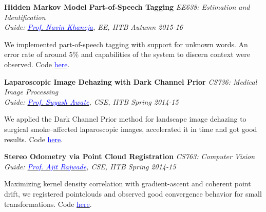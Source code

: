 \documentclass[margin,line]{res}
\newenvironment{list1}{
  \begin{list}{\ding{113}}{%
      \setlength{\itemsep}{0in}
      \setlength{\parsep}{0in} \setlength{\parskip}{0in}
      \setlength{\topsep}{0in} \setlength{\partopsep}{0in} 
      \setlength{\leftmargin}{0.17in}}}{\end{list}}
\begin{document}
\begin{resume}
\vspace*{-0.1in}

{\bf Hidden Markov Model Part-of-Speech Tagging} \hfill \textit{EE638: Estimation and Identification} \\
{\em Guide: \href{https://www.ee.iitb.ac.in/course/~ee638/Navin}{\textcolor{blue}{Prof. Navin Khaneja}}, EE, IITB \hfill Autumn 2015-16} \\
\vspace*{-.15in}
\begin{list1}
\item[] We implemented part-of-speech tagging with support for unknown words. An error rate of around 5\% and capabilities of the system to discern context were observed. Code \href{https://github.com/alankarkotwal/pos-tagging}{\textcolor{blue} {here}}.
\end{list1}

\vspace*{-0.1in}

{\bf Laparoscopic Image Dehazing with Dark Channel Prior} \hfill \textit{CS736: Medical Image Processing} \\
{\em Guide: \href{https://www.cse.iitb.ac.in/~suyash}{\textcolor{blue}{Prof. Suyash Awate}}, CSE, IITB \hfill Spring 2014-15} \\
\vspace*{-.15in}
\begin{list1}
\item[] We applied the Dark Channel Prior method for landscape image dehazing to surgical smoke--affected laparoscopic images, accelerated it in time and got good results. Code \href{https://github.com/riddhishb/Laproscopic-Image-Dehazing}{\textcolor{blue} {here}}.
\end{list1}

\vspace*{-0.1in}

{\bf Stereo Odometry via Point Cloud Registration} \hfill \textit{CS763: Computer Vision} \\
{\em Guide: \href{https://www.cse.iitb.ac.in/~ajitvr}{\textcolor{blue}{Prof. Ajit Rajwade}}, CSE, IITB \hfill Spring 2014-15} \\
\vspace*{-.15in}
\begin{list1}
\item[] Maximizing kernel density correlation with gradient-ascent and coherent point drift, we registered pointclouds and observed good convergence behavior for small transformations. Code \href{https://github.com/alankarkotwal/stereo-vo}{\textcolor{blue} {here}}.
\end{list1}


\end{resume}
\end{document}

